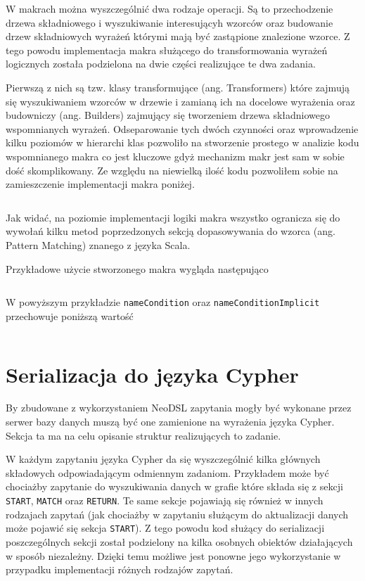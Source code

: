 \documentclass[brudnopis]{xmgr}
\begin{document}
W makrach można wyszczególnić dwa rodzaje operacji. Są to przechodzenie drzewa składniowego i wyszukiwanie interesującyh wzorców oraz budowanie drzew składniowych wyrażeń którymi mają być zastąpione znalezione wzorce. Z tego powodu implementacja makra służącego do transformowania wyrażeń logicznych została podzielona na dwie części realizujące te dwa zadania.

Pierwszą z nich są tzw. klasy transformujące (ang. Transformers) które zajmują się wyszukiwaniem wzorców w drzewie i zamianą ich na docelowe wyrażenia oraz budowniczy (ang. Builders) zajmujący się tworzeniem drzewa składniowego wspomnianych wyrażeń. Odseparowanie tych dwóch czynności oraz wprowadzenie kilku poziomów w hierarchi klas pozwoliło na stworzenie prostego w analizie kodu wspomnianego makra co jest kluczowe gdyż mechanizm makr jest sam w sobie dość skomplikowany.  Ze względu na niewielką ilość kodu pozwoliłem sobie na zamieszczenie implementacji makra poniżej.

\inputminted{scala}{listings/scala/boolean-macro-implementation.scala}

Jak widać, na poziomie implementacji logiki makra wszystko ogranicza się do wywołań kilku metod poprzedzonych sekcją dopasowywania do wzorca (ang. Pattern Matching) znanego z języka Scala.

Przykładowe użycie stworzonego makra wygląda następująco

\inputminted{scala}{listings/scala/macro-usage.scala}

W powyższym przykładzie \texttt{nameCondition} oraz  \texttt{nameConditionImplicit} przechowuje poniższą wartość

\inputminted{scala}{listings/scala/macro-usage-result.scala}

\section{Serializacja do języka Cypher}

By zbudowane z wykorzystaniem NeoDSL zapytania mogły być wykonane przez serwer bazy danych muszą być one zamienione na wyrażenia języka Cypher. Sekcja ta ma na celu opisanie struktur realizujących to zadanie. 

W każdym zapytaniu języka Cypher da się wyszczególnić kilka głównych składowych odpowiadającym odmiennym zadaniom. Przykładem może być chociażby zapytanie do wyszukiwania danych w grafie które składa się z sekcji \texttt{START}, \texttt{MATCH} oraz \texttt{RETURN}. Te same sekcje pojawiają się również w innych rodzajach zapytań (jak chociażby w zapytaniu służącym do aktualizacji danych może pojawić się sekcja \texttt{START}). Z tego powodu kod służący do serializacji poszczególnych sekcji  został podzielony na kilka osobnych obiektów działających w sposób niezależny. Dzięki temu możliwe jest ponowne jego wykorzystanie w przypadku implementacji różnych rodzajów zapytań.
\end{document}
